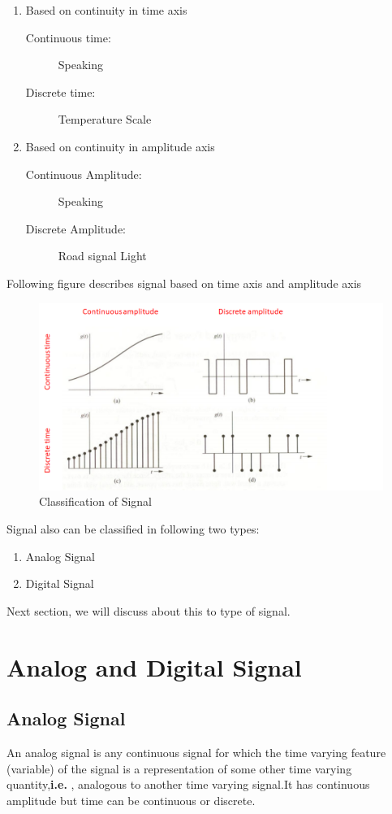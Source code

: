 \documentclass{report}
\begin{document}
\begin{enumerate}
\item Based on continuity in time axis
      \begin{description}
        \item[Continuous time:] Speaking
    	\item[Discrete time:] Temperature Scale
      \end{description}

\item Based on continuity in amplitude axis
      \begin{description}
        \item[Continuous Amplitude:] Speaking
    	\item[Discrete Amplitude:] Road signal Light
      \end{description}

\end{enumerate}
Following figure describes signal based on time axis and amplitude axis
\begin{figure}[h!]
    \centering
    \includegraphics[width = .8\textwidth]{classsignal.png}
    \caption{Classification of Signal}
    \label{fig:classsignal}
\end{figure}

Signal also can be classified in following two types:
\begin{enumerate}
\item Analog Signal
\item Digital Signal
\end{enumerate}
Next section, we will discuss about this to type of signal.

\section{Analog and Digital Signal}

\subsection{Analog Signal}
An analog signal is any continuous signal for which the time varying feature (variable) of the signal is a representation of some other time varying quantity,\textbf{i.e.} , analogous to another time varying signal.It has continuous amplitude but time can be continuous or discrete.
\end{document}
